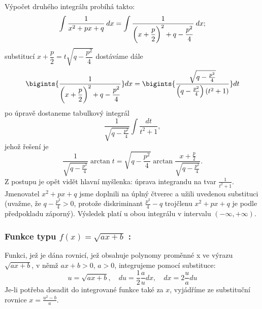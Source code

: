       Výpočet druhého integrálu probíhá takto: 
      \begin{equation}\label{MA:int_ex_10}
        \int\dfrac{1}{x^2+px+q}\hspace{2pt}dx = 
          \int\dfrac{1}{\left(x+\dfrac{p}{2}\right)^2 + q - \dfrac{p^2}{4}}\hspace{2pt}dx;
      \end{equation}
      substitucí $x+\dfrac{p}{2} = t\sqrt{q - \dfrac{p^2}{4}}$ dostáváme dále
      \begin{equation*}\label{MA:int_ex_11}
        \bigints{\frac{1}{\displaystyle{\left(x+\frac{p}{2}\right)^2 + q - \frac{p^2}{4}}}}dx 
          =\displaystyle{
            \bigints{
              \frac{\sqrt{q-\frac{p^2}{4}}}{\left(q-\frac{p^2}{4}\right)(t^2+1)}}dt
            }   
      \end{equation*}
      po úpravě dostaneme tabulkový integrál
      \begin{equation}\label{MA:int_ex_12}
        \frac{1}{\sqrt{q-\frac{p^2}{4}}}\int{\frac{dt}{t^2+1}},
      \end{equation}
      jehož řešení je  
      \begin{equation*}\label{MA:int_ex_13}
        \frac{1}{\sqrt{q-\frac{p^2}{4}}}\arctan{t} 
          = \sqrt{q-\frac{p^2}{4}}\arctan\frac{x+\frac{p}{2}}{\sqrt{q-\frac{p^2}{4}}}.     
      \end{equation*}   
      Z postupu je opět vidět hlavní myšlenka: úprava integrandu na tvar $\frac{1}{t^2+1}$.
      Jmenovatel $x^2+px+q$ jsme doplnili na úplný čtverec a užili uvedenou substituci (uvažme,
      že $q-\frac{p^2}{4}>0$, protože diskriminant $\frac{p^2}{4}-q$ trojčlenu $x^2+px+q$ je
      podle předpokladu záporný). Výsledek platí u obou integrálu v intervalu \((-\infty,
      +\infty)\).
      
      \subsubsection*{Funkce typu $\boxed{f(x)=\sqrt{ax+b}}$ :}
         Funkci, jež je dána rovnicí, jež obsahuje polynomy proměnné x  ve výrazu $\sqrt{ax+b}$,
         v němž $ax+b>0$, $a>0$, integrujeme pomocí substituce:
         \begin{equation}\label{ma:eq_sub_fce1}
             u=\sqrt{ax+b},\quad du=\frac{1}{2}\frac{a}{u}dx,\quad dx=2\frac{u}{a}du
         \end{equation}
         Je-li potřeba dosadit do integrované funkce také za $x$, vyjádříme ze substituční
         rovnice $x=\frac{u^2-b}{a}$.
